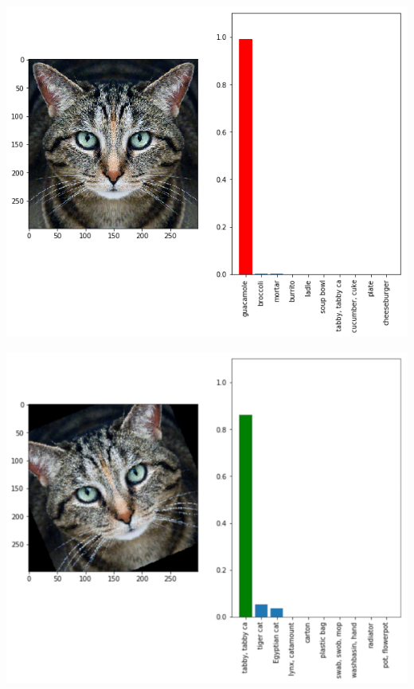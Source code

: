 \documentclass[aspectratio=169,x11names]{beamer}
\begin{document}
\begin{frame}
\begin{center}
\includegraphics[height=\textheight]{images/cat_adversarial.png} 
\end{center}
\end{frame}

\begin{frame}
\begin{center}
\includegraphics[height=\textheight]{images/cat_rotated.png} 
\end{center}
\end{frame}
\end{document}
